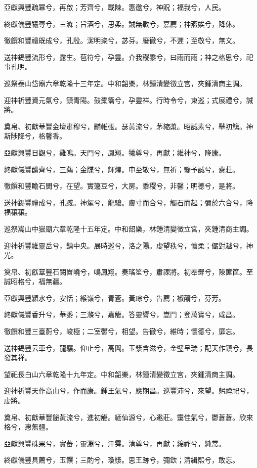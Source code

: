 \begin{pinyinscope}
亞獻興豐疏冪兮，再啟；芳齊兮，載陳。惠邀兮，神貺；福我兮，人民。

終獻儀豐犧尊兮，三滌；旨酒兮，思柔。誠無斁兮，嘉薦；神燕娭兮，降休。

徹饌和豐禮既成兮，孔殷。潔明粢兮，苾芬。廢徹兮，不遲；至敬兮，無文。

送神錫豐流形兮，露生。苞符兮，孕靈。介我稷黍兮，曰雨而雨；神之格思兮，祀事孔明。

巡祭泰山岱廟六章乾隆十三年定。中和韶樂，林鍾清變徵立宮，夾鍾清商主調。

迎神祈豐資元氣兮，鎮青陽。鼓橐籥兮，孕靈祥。行時令兮，東巡；式展禮兮，誠將。

奠帛、初獻華豐金壇肅穆兮，黼帷張。瑟黃流兮，茅縮漿。昭誠素兮，舉初觴。神斯陟降兮，格馨香。

亞獻興豐日觀兮，雞鳴。天門兮，鳳翔。犧尊兮，再獻；維神兮，降康。

終獻儀豐醴齊兮，三薦；金牒兮，輝煌。申至敬兮，無祈；鑒予誠兮，齋莊。

徹饌和豐瞻石閭兮，在望。實籩豆兮，大房。黍稷兮，非馨；明德兮，是將。

送神錫豐禮成兮，孔臧。神駕兮，龍驤。膚寸而合兮，觸石而起；彌於六合兮，降福穰穰。

巡祭嵩山中嶽廟六章乾隆十五年定。中和韶樂，林鍾清變徵立宮，夾鍾清商主調。

迎神祈豐維靈岳兮，鎮中央。展時巡兮，洛之陽。虔望秩兮，懷柔；儼對越兮，神光。

奠帛、初獻華豐石闕岧嶢兮，鳴鳳翔。奏瑤笙兮，肅祼將。初奉斝兮，陳篚筐。至誠昭格兮，福無疆。

亞獻興豐潁水兮，安恬；緱嶺兮，青蒼。黃琮兮，告薦；椒醑兮，芬芳。

終獻儀豐香升兮，華黍；三滌兮，嘉觴。答靈響兮，嵩門；登萬寶兮，咸昌。

徹饌和豐三臺蔚兮，峻極；二室鬱兮，相望。告徹兮，維時；懷德兮，靡忘。

送神錫豐云車兮，龍驤。仰止兮，高閶。玉漿含滋兮，金璧呈瑞；配天作鎮兮，長發其祥。

望祀長白山六章乾隆十九年定。中和韶樂，林鍾清變徵立宮，夾鍾清商主調。

迎神祈豐天作高山兮，作而康。鍾王氣兮，應期昌。巡豐沛兮，來望。躬禋祀兮，虔將。

奠帛、初獻華豐飶黃流兮，進初觴。緬仙源兮，心遫莊。靄佳氣兮，鬱蒼蒼。欣來格兮，惠無疆。

亞獻興豐硃果兮，實蕃；靈淵兮，澤雱。清尊兮，再獻；綿祚兮，純常。

終獻儀豐具薦兮，玉饌；三酌兮，瓊漿。思王跡兮，彌欽；清緝熙兮，敢忘。


\end{pinyinscope}
